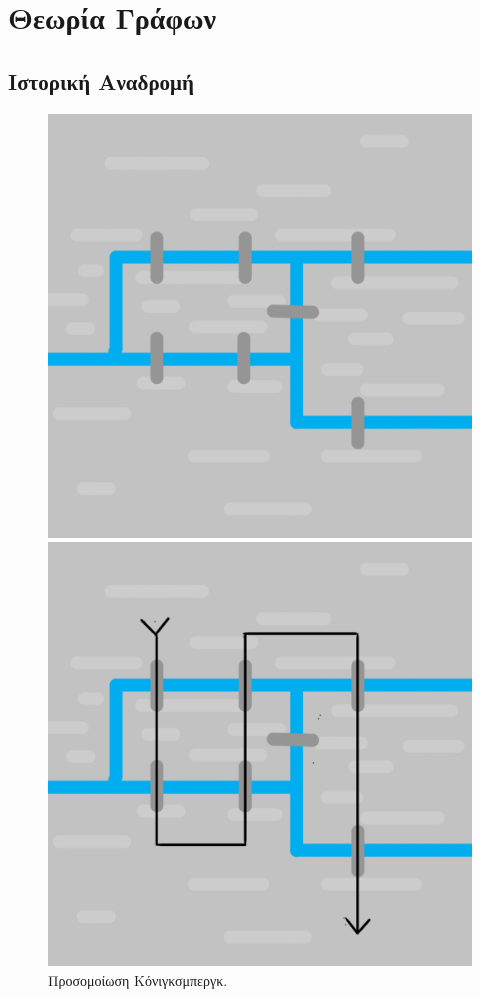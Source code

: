 \section{Θεωρία Γράφων}

\subsection{Ιστορική Αναδρομή}
\begin{figure}[ht]
    \begin{minipage}[c]{.46\linewidth}
        \centering
        \includegraphics[scale=0.15]{2947_thesis/pictures/konigsberg.png}
        \caption{Προσομοίωση Κόνιγκσμπεργκ.}
    \end{minipage}
    \hfill%
    \begin{minipage}[c]{.46\linewidth}
        \centering
        \includegraphics[scale=0.15]{2947_thesis/pictures/konigsbergEx.png} 

\end{minipage}
\end{figure}
